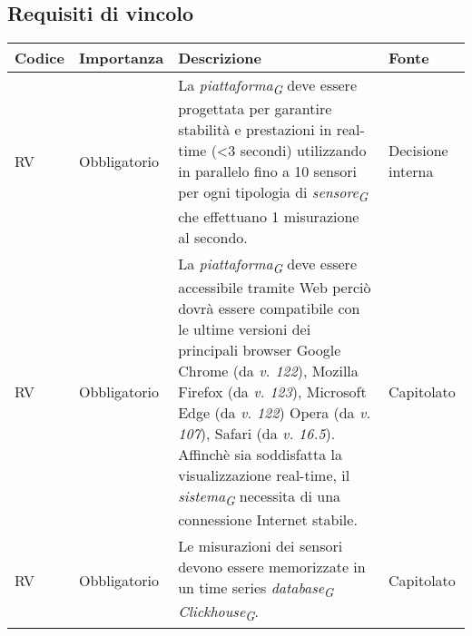 \subsection{Requisiti di vincolo}
\setcounter{rowcounter}{0}
\begin{longtable}{|C{1.5cm}|C{2cm}|L{5cm}|C{2cm}|}
    \hline
    \textbf{Codice} & \textbf{Importanza} & \textbf{Descrizione} & \textbf{Fonte}  \\

    \hline
     RV & Obbligatorio & La \textit{piattaforma}\textsubscript{\textit{G}} deve essere progettata per garantire stabilità e prestazioni in real-time (<3 secondi) utilizzando in parallelo fino a 10 sensori per ogni tipologia di \textit{sensore}\textsubscript{\textit{G}} che effettuano 1 misurazione al secondo. & Decisione interna \\

    \hline
     RV & Obbligatorio & La \textit{piattaforma}\textsubscript{\textit{G}} deve essere accessibile tramite Web perciò dovrà essere compatibile con le ultime versioni dei principali browser Google Chrome (da \textit{v. 122}), Mozilla Firefox (da \textit{v. 123}), Microsoft Edge (da \textit{v. 122}) Opera (da \textit{v. 107}), Safari (da \textit{v. 16.5}). Affinchè sia soddisfatta la visualizzazione real-time, il \textit{sistema}\textsubscript{\textit{G}} necessita di una connessione Internet stabile. & Capitolato\\   

    \hline
     RV & Obbligatorio & Le misurazioni dei sensori devono essere memorizzate in un time series \textit{database}\textsubscript{\textit{G}} \textit{Clickhouse}\textsubscript{\textit{G}}. & Capitolato\\   
    
    \hline
\end{longtable}




